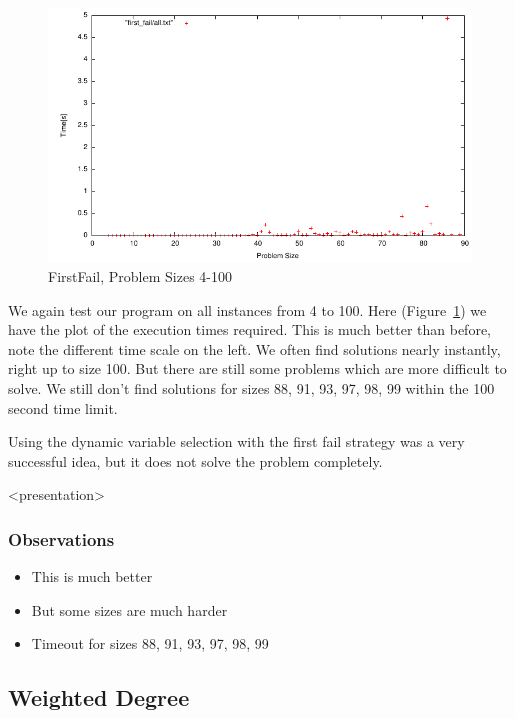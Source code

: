 \begin{figure}[h]
\caption{\label{nqueen:firstfail} FirstFail, Problem Sizes 4-100}
\begin{center}
\includegraphics[width=12cm]{../nqueen/first_fail/all}
\end{center}
\end{figure}

We again test our program on all instances from 4 to 100. Here (Figure~\ref{nqueen:firstfail}) we have the plot of the execution times required. This is much better than before, note the different time scale on the left. We often find solutions nearly instantly, right up to size 100. But there are still some problems which are more difficult to solve. We still don't find solutions for sizes 88, 91, 93, 97, 98, 99 within the 100 second time limit.

Using the dynamic variable selection with the first fail strategy was a very successful idea, but it does not solve the problem completely.

\begin{frame}<presentation>
\frametitle{Observations}
\begin{itemize}
\item This is much better
\item But some sizes are much harder
\item Timeout for sizes 88, 91, 93, 97, 98, 99
\end{itemize}
\end{frame}

\clearpage
\subsection{Weighted Degree}

